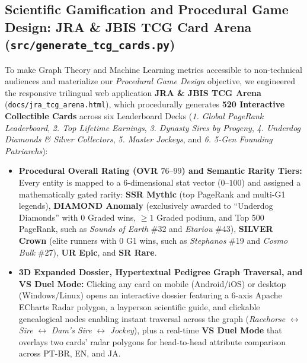 \documentclass[12pt,a4paper]{article}
\begin{document}
\subsection{Scientific Gamification and Procedural Game Design: JRA \& JBIS TCG Card Arena (\texttt{src/generate\_tcg\_cards.py})}
To make Graph Theory and Machine Learning metrics accessible to non-technical audiences and materialize our \textit{Procedural Game Design} objective, we engineered the responsive trilingual web application \textbf{JRA \& JBIS TCG Arena} (\texttt{docs/jra\_tcg\_arena.html}), which procedurally generates \textbf{520 Interactive Collectible Cards} across six Leaderboard Decks (\textit{1. Global PageRank Leaderboard}, \textit{2. Top Lifetime Earnings}, \textit{3. Dynasty Sires by Progeny}, \textit{4. Underdog Diamonds \& Silver Collectors}, \textit{5. Master Jockeys}, and \textit{6. 5-Gen Founding Patriarchs}):
\begin{itemize}
    \item \textbf{Procedural Overall Rating (OVR $76\text{--}99$) and Semantic Rarity Tiers:} Every entity is mapped to a 6-dimensional stat vector ($0\text{--}100$) and assigned a mathematically gated rarity: \textbf{SSR Mythic} (top PageRank and multi-G1 legends), \textbf{DIAMOND Anomaly} (exclusively awarded to ``Underdog Diamonds'' with $0$ Graded wins, $\ge 1$ Graded podium, and Top 500 PageRank, such as \textit{Sounds of Earth} \#32 and \textit{Etariou} \#43), \textbf{SILVER Crown} (elite runners with $0$ G1 wins, such as \textit{Stephanos} \#19 and \textit{Cosmo Bulk} \#27), \textbf{UR Epic}, and \textbf{SR Rare}.
    \item \textbf{3D Expanded Dossier, Hypertextual Pedigree Graph Traversal, and VS Duel Mode:} Clicking any card on mobile (Android/iOS) or desktop (Windows/Linux) opens an interactive dossier featuring a 6-axis Apache ECharts Radar polygon, a layperson scientific guide, and clickable genealogical nodes enabling instant traversal across the graph (\textit{Racehorse} $\leftrightarrow$ \textit{Sire} $\leftrightarrow$ \textit{Dam's Sire} $\leftrightarrow$ \textit{Jockey}), plus a real-time \textbf{VS Duel Mode} that overlays two cards' radar polygons for head-to-head attribute comparison across PT-BR, EN, and JA.
\end{itemize}
\end{document}
